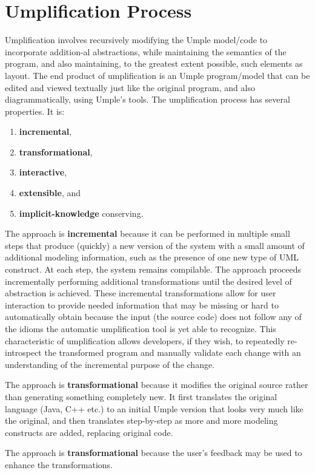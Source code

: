 \section{Umplification Process}
Umplification involves recursively modifying the Umple model/code to incorporate addition-al abstractions, while maintaining the semantics of the program, and also maintaining, to the greatest extent possible, such elements as layout. The end product of umplification is an Umple program/model that can be edited and viewed textually just like the original program, and also diagrammatically, using Umple's tools. 
The umplification process has several properties. It is:
\begin{enumerate}
 \item \textbf{incremental}, 
 \item \textbf{transformational},
 \item \textbf{interactive},  
 \item \textbf{extensible}, and
 \item \textbf{implicit-knowledge} conserving. 
\end{enumerate}

The approach is \textbf{incremental} because it can be performed in multiple small steps that produce (quickly) a new version of the system with a small amount of additional modeling information, such as the presence of one new type of UML construct. At each step, the system remains compilable. The approach proceeds incrementally performing additional transformations until the desired level of abstraction is achieved.	These incremental transformations allow for user interaction to provide needed information that may be missing or hard to automatically obtain because the input (the source code) does not follow any of the idioms the automatic umplification tool is yet able to recognize. This characteristic of umplification allows developers, if they wish, to repeatedly re-introspect the transformed program and manually validate each change with an understanding of the incremental purpose of the change.

The approach is \textbf{transformational} because it modifies the original source rather than generating something completely new. It first translates the original language (Java, C++ etc.) to an initial Umple version that looks very much like the original, and then translates step-by-step as more and more modeling constructs are added, replacing original code.

The approach is \textbf{transformational} because the user's feedback may be used to enhance the transformations.

